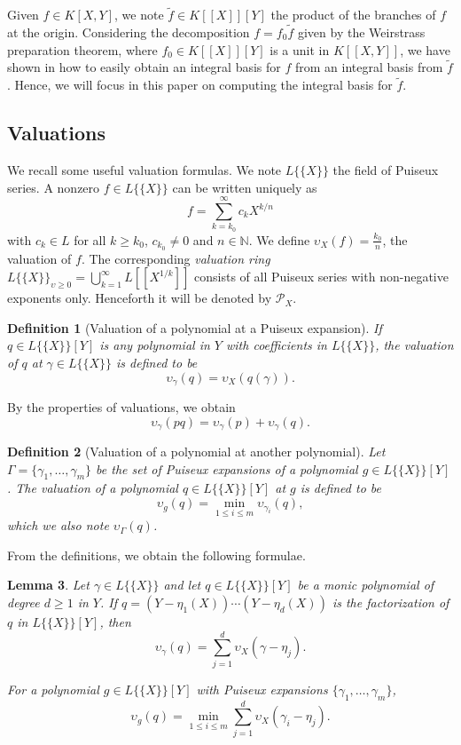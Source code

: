 \documentclass[a4paper,11pt]{amsart}%
\theoremstyle{definition}
\theoremstyle{plain}
\newtheorem{defn}{Definition}[section]
\newtheorem{lemma}[defn]{Lemma}
\theoremstyle{remark}
\newcommand{\N}{{\mathbb N}}
\begin{document}
Given $f \in K[X,Y]$, we note $\tilde f \in K[[X]][Y]$ the product of the branches of $f$ at the origin. Considering the decomposition $f = f_0 \tilde f$ given by the Weirstrass preparation theorem, where $f_0 \in K[[X]][Y]$ is a unit in $K[[X,Y]]$, we have shown in \cite[Proposition 41]{intbas} how to easily obtain an integral basis for $f$ from an integral basis from $\tilde f$. Hence, we will focus in this paper on computing the integral basis for $\tilde f$.

\subsection{Valuations}

We recall some useful valuation formulas. We note $L\{\{X\}\}$ the field of Puiseux series. A nonzero $f \in L\{\{X\}\}$ can be written uniquely as
$$
f = \sum_{k = k_0}^\infty c_k X^{k / n}
$$
with $c_k \in L$ for all $k \ge k_0$, $c_{k_0} \neq 0$ and $n \in \N$. We define $\upsilon_X(f) = \frac{k_0}{n}$, the valuation of $f$.
The corresponding \emph{valuation ring}
$L\{\{X\}\}_{\upsilon\geq0}=\bigcup_{k=1}^{\infty}L[[X^{1/k}]]$ consists of all Puiseux series
with non-negative exponents only. Henceforth it will be denoted by ${\mathcal{P}_{X}}$.


\begin{defn}[Valuation of a polynomial at a Puiseux expansion]
If $q\in L\{\{X\}\}[Y]$ is any polynomial in $Y$ with coefficients in
$L\{\{X\}\}$, the {\emph{valuation}} of $q$ at $\gamma\in L\{\{X\}\}$ is
defined to be
$$\upsilon_{\gamma}(q)=\upsilon_X(q(\gamma)).$$
\end{defn}

By the properties of valuations, we obtain
$$
\upsilon_{\gamma}(pq)= \upsilon_{\gamma}(p) + \upsilon_{\gamma}(q).
$$




\begin{defn}[Valuation of a polynomial at another polynomial]
Let $\Gamma=\{\gamma_{1},\dots,\gamma_{m}\}$ be the set of Puiseux
expansions of a polynomial $g \in L\{\{X\}\}[Y]$. The {\emph{valuation}} of a polynomial $q\in L\{\{X\}\}[Y]$
at $g$ is defined to be
$$\upsilon_{g}(q)=\min_{1 \leq i \leq m} \upsilon_{\gamma_{i}}(q),$$
which we also note $\upsilon_{\Gamma}(q)$.
\end{defn}

From the definitions, we obtain the following formulae.

\begin{lemma}
\label{lemma:gammaAtq}
Let $\gamma \in L\{\{X\}\}$ and let $q \in L\{\{X\}\}[Y]$ be a monic polynomial of degree $d\geq 1$ in $Y$.  %
If $q=(Y-\eta_{1}(X))\cdots(Y-\eta_{d}(X))$ is the factorization of $q$ in $L\{\{X\}\}[Y]$, then
\[
\upsilon_{\gamma}(q)= \sum_{j=1}^{d}\upsilon_X(\gamma-\eta_{j}).
\]

For a polynomial $g \in L\{\{X\}\}[Y]$ with Puiseux expansions $\{\gamma_{1},\dots,\gamma_{m}\}$,
\[
\upsilon_{g}(q)=\min_{1 \leq i \leq m}\sum_{j=1}^{d}\upsilon_X(\gamma_{i}-\eta_{j})\text{.}%
\]
\end{lemma}
\end{document}
